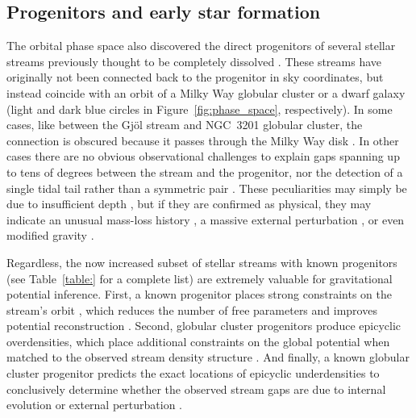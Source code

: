 \documentclass[final,5p,times,twocolumn,authoryear]{elsarticle}
\begin{document}
\subsection{Progenitors and early star formation}
\label{sec:progenitors}
The orbital phase space also discovered the direct progenitors of several stellar streams previously thought to be completely dissolved \citep{palau:2019,riley:2020,ibata:2019b,ibata:2021,bonaca:2021}.
These streams have originally not been connected back to the progenitor in sky coordinates, but instead coincide with an orbit of a Milky Way globular cluster or a dwarf galaxy (light and dark blue circles in Figure~\ref{fig:phase_space}, respectively).
In some cases, like between the Gj\" ol stream and NGC~3201 globular cluster, the connection is obscured because it passes through the Milky Way disk \citep{riley:2020}.
In other cases there are no obvious observational challenges to explain gaps spanning up to tens of degrees between the stream and the progenitor, nor the detection of a single tidal tail rather than a symmetric pair \citep[e.g,][]{bonaca:2021, yang:2022b}.
These peculiarities may simply be due to insufficient depth \citep[e.g., non-detections of the low-mass stars that populate cluster tails in the early phases of dissolution][]{balbinot:2018}, but if they are confirmed as physical, they may indicate an unusual mass-loss history \citep[e.g., due to a population of black holes in the progenitor][]{roberts:2024}, a massive external perturbation \citep[e.g., from the Galactic bar,][]{pearson:2017}, or even modified gravity \citep[causing asymmetric escape into the leading and trailing tails][]{thomas:2018}.

Regardless, the now increased subset of stellar streams with known progenitors (see Table~\ref{table:} for a complete list) are extremely valuable for gravitational potential inference.
First, a known progenitor places strong constraints on the stream's orbit \citep{bh:2018}, which reduces the number of free parameters and improves potential reconstruction \citep{palau:2023}.
Second, globular cluster progenitors produce epicyclic overdensities, which place additional constraints on the global potential when matched to the observed stream density structure \citep{kupper:2015}.
And finally, a known globular cluster progenitor predicts the exact locations of epicyclic underdensities to conclusively determine whether the observed stream gaps are due to internal evolution or external perturbation \citep[cf.][]{ibata:2020}.
\end{document}
